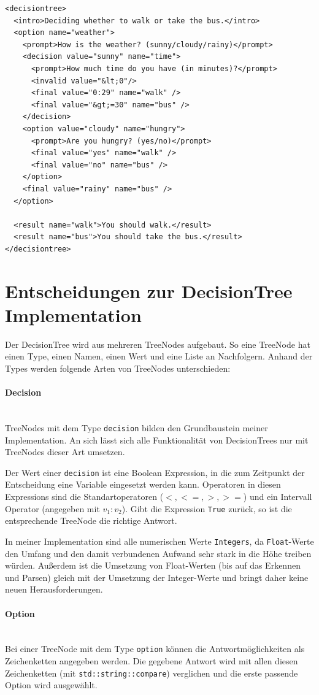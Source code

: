 \documentclass[a4paper,12pt]{article}
\newcommand{\myparagraph}[1]{\paragraph*{#1}\mbox{}\\}
\begin{document}
\begin{verbatim}
<decisiontree>
  <intro>Deciding whether to walk or take the bus.</intro>
  <option name="weather">
    <prompt>How is the weather? (sunny/cloudy/rainy)</prompt>
    <decision value="sunny" name="time">
      <prompt>How much time do you have (in minutes)?</prompt>
      <invalid value="&lt;0"/>
      <final value="0:29" name="walk" />
      <final value="&gt;=30" name="bus" />
    </decision>
    <option value="cloudy" name="hungry">
      <prompt>Are you hungry? (yes/no)</prompt>
      <final value="yes" name="walk" />
      <final value="no" name="bus" />
    </option>
    <final value="rainy" name="bus" />
  </option>

  <result name="walk">You should walk.</result>
  <result name="bus">You should take the bus.</result>
</decisiontree>
\end{verbatim}

\section*{Entscheidungen zur DecisionTree Implementation}
Der DecisionTree wird aus mehreren TreeNodes aufgebaut. So eine TreeNode hat einen Type, einen Namen, einen Wert und eine Liste an Nachfolgern. Anhand der Types werden folgende Arten von TreeNodes unterschieden:

\myparagraph{Decision}
TreeNodes mit dem Type \texttt{decision} bilden den Grundbaustein meiner Implementation. An sich lässt sich alle Funktionalität von DecisionTrees nur mit TreeNodes dieser Art umsetzen.

Der Wert einer \texttt{decision} ist eine Boolean Expression, in die zum Zeitpunkt der Entscheidung eine Variable eingesetzt werden kann. Operatoren in diesen Expressions sind die Standartoperatoren ($<, <=, >, >=$) und ein Intervall Operator (angegeben mit $v_1:v_2$). Gibt die Expression \texttt{True} zurück, so ist die entsprechende TreeNode die richtige Antwort.

In meiner Implementation sind alle numerischen Werte \texttt{Integers}, da \texttt{Float}-Werte den Umfang und den damit verbundenen Aufwand sehr stark in die Höhe treiben würden.
Außerdem ist die Umsetzung von Float-Werten (bis auf das Erkennen und Parsen) gleich mit der Umsetzung der Integer-Werte und bringt daher keine neuen Herausforderungen. 

\myparagraph{Option}
Bei einer TreeNode mit dem Type \texttt{option} können die Antwortmöglichkeiten als Zeichenketten angegeben werden. Die gegebene Antwort wird mit allen diesen Zeichenketten (mit \texttt{std::string::compare}) verglichen und die erste passende Option wird ausgewählt.
\end{document}
